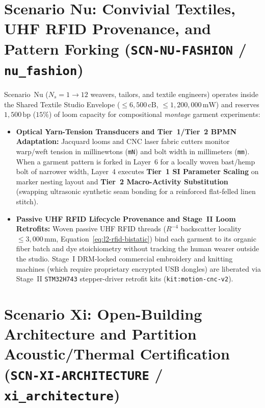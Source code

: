 \section{Scenario Nu: Convivial Textiles, UHF RFID Provenance, and Pattern Forking (\texttt{SCN-NU-FASHION} / \texttt{nu\_fashion})}
\label{sec:l2-wave-d-nu}

Scenario~Nu ($N_s = 1 \to 12$ weavers, tailors, and textile engineers) operates inside the Shared Textile Studio Envelope ($\le 6{,}500\,\mathrm{cB}$, $\le 1{,}200{,}000\,\mathrm{mW}$) and reserves $1{,}500\,\mathrm{bp}$ ($15\%$) of loom capacity for compositional \textit{montage} garment experiments:
\begin{itemize}
    \item \textbf{Optical Yarn-Tension Transducers and Tier~1/Tier~2 BPMN Adaptation:} Jacquard looms and CNC laser fabric cutters monitor warp/weft tension in millinewtons (\texttt{mN}) and bolt width in millimeters (\texttt{mm}). When a garment pattern is forked in Layer~6 for a locally woven bast/hemp bolt of narrower width, Layer~4 executes \textbf{Tier~1 SI Parameter Scaling} on marker nesting layout and \textbf{Tier~2 Macro-Activity Substitution} (swapping ultrasonic synthetic seam bonding for a reinforced flat-felled linen stitch).
    \item \textbf{Passive UHF RFID Lifecycle Provenance and Stage~II Loom Retrofits:} Woven passive UHF RFID threads ($R^{-4}$ backscatter locality $\le 3{,}000\,\mathrm{mm}$, Equation~\eqref{eq:l2-rfid-bistatic}) bind each garment to its organic fiber batch and dye stoichiometry without tracking the human wearer outside the studio. Stage~I DRM-locked commercial embroidery and knitting machines (which require proprietary encrypted USB dongles) are liberated via Stage~II \texttt{STM32H743} stepper-driver retrofit kits (\texttt{kit:motion-cnc-v2}).
\end{itemize}

\section{Scenario Xi: Open-Building Architecture and Partition Acoustic/Thermal Certification (\texttt{SCN-XI-ARCHITECTURE} / \texttt{xi\_architecture})}
\label{sec:l2-wave-d-xi}

